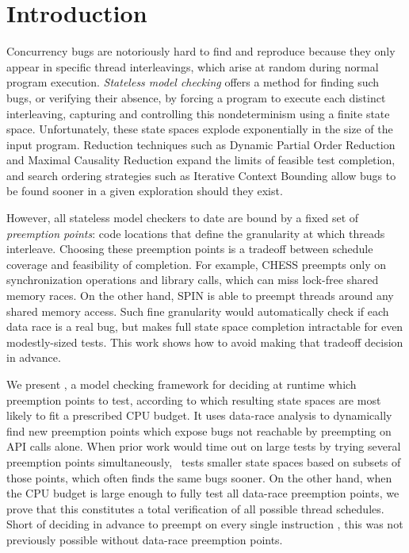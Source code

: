 \section{Introduction}

Concurrency bugs are notoriously hard to find and reproduce because they only appear in specific thread interleavings, which arise at random during normal program execution.
{\em Stateless model checking} \cite{verisoft} offers a method for finding such bugs,
or verifying their absence,
by forcing a program to execute each distinct interleaving,
capturing and controlling this nondeterminism using a finite state space.
Unfortunately, these state spaces explode exponentially in the size of the input program.
Reduction techniques such as Dynamic Partial Order Reduction \cite{dpor} and Maximal Causality Reduction \cite{mcr} expand the limits of feasible test completion,
and search ordering strategies such as Iterative Context Bounding \cite{chess-icb} allow bugs to be found sooner in a given exploration should they exist.

However, all stateless model checkers to date are bound by a fixed set of {\em preemption points}: code locations that define the granularity at which threads interleave.
Choosing these preemption points is a tradeoff between schedule coverage and feasibility of completion.
For example, \textsc{CHESS} \cite{chess} preempts only on synchronization operations and library calls, which can miss lock-free shared memory races.
%
On the other hand, SPIN \cite{spin}
is able to preempt threads around any shared memory access. Such fine granularity would automatically check if each data race is a real bug, but makes full state space completion intractable for even modestly-sized tests.
%
This work shows how to avoid making that tradeoff decision in advance.

We present \quicksand,
a model checking framework for deciding at runtime which preemption points to test,
according to which resulting state spaces are most likely to fit a prescribed CPU budget.
It uses data-race analysis to dynamically find new preemption points which expose bugs not reachable by preempting on API calls alone.
When prior work would time out on large tests by trying several preemption points simultaneously,
\quicksand~tests smaller state spaces based on subsets of those points, which often finds the same bugs sooner.
On the other hand, when the CPU budget is large enough to fully test all data-race preemption points,
we prove that this constitutes a total verification of all possible thread schedules.
Short of deciding in advance to preempt on every single instruction \cite{spin}, this was not previously possible without data-race preemption points.

